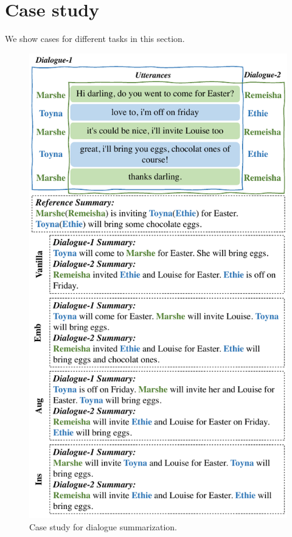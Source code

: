 \section{Case study}

We show cases for different tasks in this section.

\begin{figure}[h!]
	\centering
	\includegraphics[width=0.95\linewidth]{case-ds.pdf}
	\caption{Case study for dialogue summarization.} 
	\label{fig:case-ds}
\end{figure}

